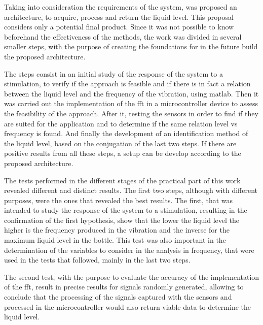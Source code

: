 Taking into consideration the requirements of the system, was proposed an architecture, to acquire, process and return the liquid level. This proposal considers only a potential final product. Since it was not possible to know beforehand the effectiveness of the methods, the work was divided in several smaller steps, with the purpose of creating the foundations for in the future build the proposed architecture.

The steps consist in an initial study of the response of the system to a stimulation, to verify if the approach is feasible and if there is in fact a relation between the liquid level and the frequency of the vibration, using \acrshort{matlab}. Then it was carried out the implementation of the \acrshort{fft} in a microcontroller device to assess the feasibility of the approach. After it, testing the sensors in order to find if they are suited for the application and to determine if the same relation level vs frequency is found. And finally the development of an identification method of the liquid level, based on the conjugation of the last two steps. If there are positive results from all these steps, a setup can be develop according to the proposed architecture.

The tests performed in the different stages of the practical part of this work revealed different and distinct results. The first two steps, although with different purposes, were the ones that revealed the best results. The first, that was intended to study the response of the system to a stimulation, resulting in the confirmation of the first hypothesis, show that the lower the liquid level the higher is the frequency produced in the vibration and the inverse for the maximum liquid level in the bottle. This test was also important in the determination of the variables to consider in the analysis in frequency, that were used in the tests that followed, mainly in the last two steps.

The second test, with the purpose to evaluate the accuracy of the implementation of the \acrshort{fft}, result in precise results for signals randomly generated, allowing to conclude that the processing of the signals captured with the sensors and processed in the microcontroller would also return viable data to determine the liquid level.

